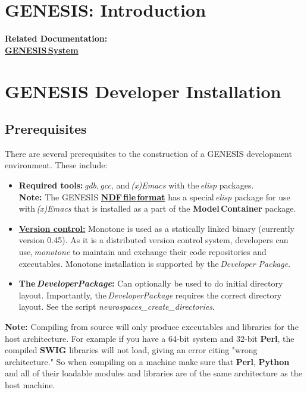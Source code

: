 \documentclass[12pt]{article}
\begin{document}
\section*{GENESIS: Introduction}

{\bf Related Documentation:} \\
\href{../genesis-system/genesis-system.tex}{\bf GENESIS\,System}

\section*{GENESIS Developer Installation}

\subsection*{Prerequisites}

There are several prerequisites to the construction of a GENESIS development environment. These include:

\begin{itemize}

\item {\bf Required tools:}\,{\it gdb},\,{\it gcc}, and\,{\it (x)Emacs} with the\,{\it elisp} packages. \\
{\bf Note:} The GENESIS \href{../ndf-file-format/ndf-file-format.tex}{\bf NDF\,file\,format} has a special\,{\it elisp} package for use with\,{\it (x)Emacs} that is installed as a part of the {\bf Model\,Container} package.
\item \href{../version-control/version-control.tex}{{\bf Version control:}} Monotone is used as a statically linked binary (currently version 0.45). As it is a distributed version control system, developers can use,\,{\it monotone} to maintain and exchange their code repositories and executables. Monotone installation is supported by the\,{\it Developer Package}. 
\item {\bf  The\,{\it DeveloperPackage}:} Can optionally be used to do initial directory layout. Importantly, the\,{\it DeveloperPackage} requires the correct directory layout. See the script {\it neurospaces\_create\_directories}.

\end{itemize}

{\bf Note:} Compiling from source will only produce executables and libraries for the host architecture. For example if you have a 64-bit system and 32-bit {\bf Perl}, the compiled {\bf SWIG} libraries will not load, giving an error citing "wrong architecture." So when compiling on a machine make sure that {\bf Perl}, {\bf Python} and all of their loadable modules and libraries are of the same architecture as the host machine.
\end{document}
